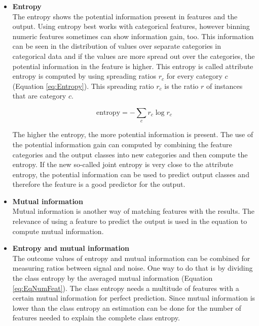 \documentclass[10pt,a4paper]{report}
\begin{document}
	\begin{itemize}
		\item \textbf{Entropy} \\
		The entropy shows the potential information present in features and the output. Using entropy best works with categorical features, however binning numeric features sometimes can show information gain, too. This information can be seen in the distribution of values over separate categories in categorical data and if the values are more spread out over the categories, the potential information in the feature is higher. This entropy is called attribute entropy is computed by using spreading ratios $r_c$ for every category $c$ (Equation \ref{eq:Entropy}). This spreading ratio $r_c$ is the ratio $r$ of instances that are category $c$.
		
		\begin{equation}\label{eq:Entropy}
		\text{entropy} = - \sum_{c} r_c \log{r_c}
		\end{equation}
		
		The higher the entropy, the more potential information is present. The use of the potential information gain can computed by combining the feature categories and the output classes into new categories and then compute the entropy. If the new so-called joint entropy is very close to the attribute entropy, the potential information can be used to predict output classes and therefore the feature is a good predictor for the output\cite{agresti2003categorical}.
		
		\item \textbf{Mutual information} \\
		Mutual information is another way of matching features with the results. The relevance of using a feature to predict the output is used in the equation to compute mutual information\cite{chow1968approximating}. 
		
		\item \textbf{Entropy and mutual information} \\
		The outcome values of entropy and mutual information can be combined for measuring ratios between signal and noise. One way to do that is by dividing the class entropy by the averaged mutual information (Equation \ref{eq:EqNumFeat}). The class entropy needs a multitude of features with a certain mutual information for perfect prediction. Since mutual information is lower than the class entropy an estimation can be done for the number of features needed to explain the complete class entropy.
		

\end{itemize}
\end{document}
